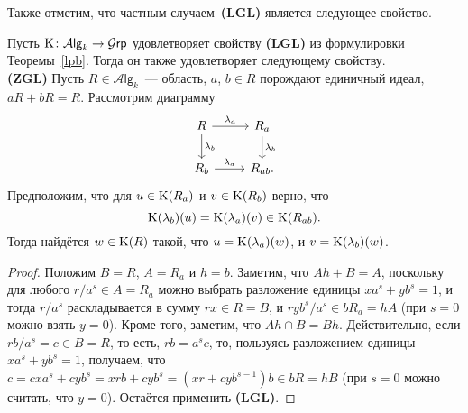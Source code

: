 \documentclass[oneside, 11pt]{amsart} \pdfoutput=1
\begin{document}
\begin{comment}
\begin{center}
\begin{tikzpicture}
\node (alp) at ( 2,  0) {\textbf{(ALP)}};
\node (asp) at ( 0,  0) {\textbf{(ASP)}}
  edge[->] (alp);
\node (hil) at ( 2, -1) {\textbf{(HIL)}}
  edge[->] (alp);
\node (cdc) at ( 0, -1) {\textbf{(CDC)}}
  edge[->] (asp)
  edge[->] (alp);
\node (zgl) at (-2, -1) {\textbf{(ZGL)}}
  edge[->] (asp);
\node (lgl) at (-2, -2) {\textbf{(LGL)}}
  edge[->] (zgl)
  edge[->, bend right = 20] (alp);
\node (hif) at (-2,  0) {\textbf{(HIF)}}
  edge[->] (asp);
\node (ght) at ( 0,  1) {\textbf{(GHT)}}
  edge[->] (asp);
\node (lgp) at ( 0,  2) {\textbf{(LGP)}}
  edge[->] (ght)
  edge[->, bend left = 20] (alp);
\node (lht) at (-2,  1) {\textbf{(LHT)}}
  edge[->] (ght);
\end{tikzpicture}
\end{center}
\end{comment}


Также отметим, что частным случаем~{\bf(LGL)} является следующее свойство.
\begin{lemma}
\label{zgl}
Пусть ${\mathrm{K}}\colon\mathcal A\mathsf{lg}_k\rightarrow\mathcal G\mathsf{rp}$ удовлетворяет свойству {\bf(LGL)} из формулировки Теоремы~\ref{lpb}. Тогда он также удовлетворяет следующему свойству.\\
{\rm\bf(ZGL)}
Пусть $R\in\mathcal A\mathsf{lg}_k$~--- область, $a$, $b\in R$ порождают единичный идеал, $aR+bR=R$. Рассмотрим диаграмму
$$\begin{tikzcd}
R \ar{r}{\lambda_a} \ar{d}{\lambda_b} & R_a \ar{d}{\lambda_b}\\
R_b \ar{r}{\lambda_a} & R_{ab}.
\end{tikzcd}$$
Предположим, что для $u\in{\mathrm{K}}(R_a)$ и $v\in{\mathrm{K}}(R_b)$ верно, что $${\mathrm{K}}(\lambda_b)(u)={\mathrm{K}}(\lambda_a)(v)\in{\mathrm{K}}(R_{ab}).$$
Тогда найдётся $w\in{\mathrm{K}}(R)$ такой, что $u={\mathrm{K}}(\lambda_a)(w)$, и $v={\mathrm{K}}(\lambda_b)(w)$.
\end{lemma}
\begin{proof}
Положим $B=R$, $A=R_a$ и $h=b$. Заметим, что $Ah+B=A$, поскольку для любого $r/a^s\in A=R_a$ можно выбрать разложение единицы $xa^s+yb^s=1$, и тогда $r/a^s$ раскладывается в сумму $rx\in R=B$, и $ryb^s/a^s\in bR_a=hA$ (при $s=0$ можно взять $y=0$). Кроме того, заметим, что $Ah\cap B=Bh$. Действительно, если $rb/a^s=c\in B=R$, то есть, $rb=a^sc$, то, пользуясь разложением единицы $xa^s+yb^s=1$, получаем, что $c=cxa^s+cyb^s=xrb+cyb^s=(xr+cyb^{s-1})b\in bR=hB$ (при $s=0$ можно считать, что $y=0$). Остаётся применить {\bf(LGL)}.
\end{proof}
\end{document}
